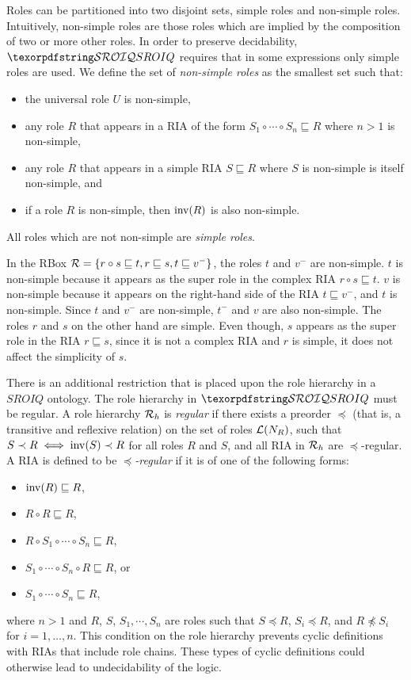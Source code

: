 Roles can be partitioned into two disjoint sets, simple roles and non-simple roles. Intuitively, non-simple roles are those roles which are implied by the composition of two or more other roles. In order to preserve decidability, $\SROIQ$ requires that in some expressions only simple roles are used. We define the set of \emph{non-simple roles} as the smallest set such that:
\begin{itemize}
  \item the universal role $U$ is non-simple,
  \item any role $R$ that appears in a RIA of the form $S_1 \circ \cdots \circ S_n \sqsubseteq R$ where $n > 1$ is non-simple,
  \item any role $R$ that appears in a simple RIA $S \sqsubseteq R$ where $S$ is non-simple is itself non-simple, and
  \item if a role $R$ is non-simple, then $\operatorname{inv}(R)$ is also non-simple.
\end{itemize}
All roles which are not non-simple are \emph{simple roles}.

\begin{example}
  In the RBox $\mathcal{R} = \{ r \circ s \sqsubseteq t, r \sqsubseteq s, t \sqsubseteq v^- \}$, the roles $t$ and $v^-$ are non-simple. $t$ is non-simple because it appears as the super role in the complex RIA $r \circ s \sqsubseteq t$. $v$ is non-simple because it appears on the right-hand side of the RIA $t \sqsubseteq v^-$, and $t$ is non-simple. Since $t$ and $v^-$ are non-simple, $t^-$ and $v$ are also non-simple. The roles $r$ and $s$ on the other hand are simple. Even though, $s$ appears as the super role in the RIA $r \sqsubseteq s$, since it is not a complex RIA and $r$ is simple, it does not affect the simplicity of $s$.
\end{example}

There is an additional restriction that is placed upon the role hierarchy in a $SROIQ$ ontology. The role hierarchy in $\SROIQ$ must be regular. A role hierarchy $\mathcal{R}_h$ is \emph{regular} if there exists a preorder $\preceq$ (that is, a transitive and reflexive relation) on the set of roles $\mathcal{L}(N_R)$, such that $S \prec R \iff \operatorname{inv}(S) \prec R$ for all roles $R$ and $S$, and all RIA in $\mathcal{R}_h$ are $\preceq$-regular. A RIA is defined to be $\preceq$\emph{-regular} if it is of one of the following forms:
\begin{itemize}
  \item $\operatorname{inv}(R) \sqsubseteq R$,
  \item $R \circ R \sqsubseteq R$,
  \item $R \circ S_1 \circ \cdots \circ S_n \sqsubseteq R$,
  \item $S_1 \circ \cdots \circ S_n \circ R \sqsubseteq R$, or
  \item $S_1 \circ \cdots \circ S_n \sqsubseteq R$,
\end{itemize}
where $n > 1$ and $R$, $S$, $S_1, \cdots, S_n$ are roles such that $S \preceq R$, $S_i \preceq R$, and $R \not\preceq S_i$ for $i = 1, \dots, n$. This condition on the role hierarchy prevents cyclic definitions with RIAs that include role chains. These types of cyclic definitions could otherwise lead to undecidability of the logic.

